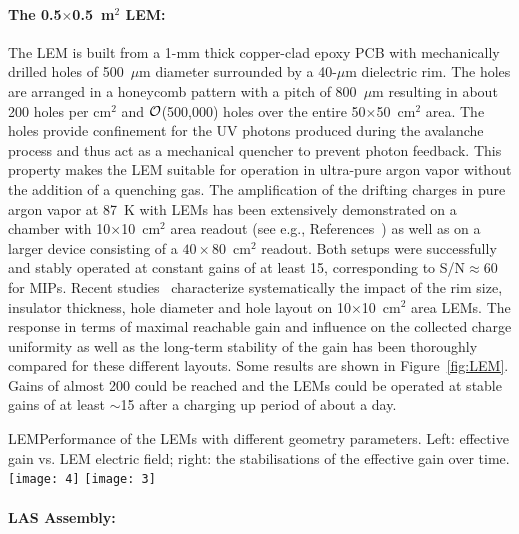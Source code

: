 \paragraph{The 0.5$\times$0.5~m$^2$ LEM:}
The LEM is built from a 1-mm thick copper-clad epoxy PCB with
mechanically drilled holes of 500~$\mu$m diameter surrounded by a
40-$\mu$m dielectric rim. The holes are arranged in a honeycomb
pattern with a pitch of 800~$\mu$m resulting in about 200 holes per cm$^2$
and $\cal O$(500,000) holes over the entire 50$\times$50~cm$^2$
area. The holes provide confinement for the UV photons produced
during the avalanche process and thus act as a mechanical quencher to
prevent photon feedback. This property makes the LEM suitable for
operation in ultra-pure argon vapor without the addition of a
quenching gas. The amplification of the drifting charges in pure argon
vapor at 87~K with LEMs has been extensively demonstrated on a chamber
with 10$\times$10~cm$^2$ area readout (see e.g.,
References~\cite{Badertscher:2008rf,Badertscher:2010fi}) as well as on a
larger device consisting of a $40\times80$~cm$^2$
readout\cite{Badertscher:2013wm}.  Both setups were successfully and stably operated 
at constant gains of at least 15,
corresponding to S/N$\approx$60 for MIPs. Recent
studies~\cite{Cantini:2014xza} characterize systematically the impact
of the rim size, insulator thickness, hole diameter and hole layout on
10$\times$10~cm$^2$ area LEMs. The response in terms of maximal
reachable gain and influence on the collected charge uniformity as
well as the long-term stability of the gain has been thoroughly
compared for these different layouts. Some results are shown in
Figure~\ref{fig:LEM}.  Gains of almost 200 could be  reached and the
LEMs could be operated at stable gains of at least $\sim$15 after a
charging up period of about a day.
\begin{cdrfigure}{LEM}{Performance of the LEMs with different geometry parameters. Left: effective gain vs. LEM electric field; right: the stabilisations of the effective gain over time.}
\texttt{[image: 4]}
\texttt{[image: 3]}
\end{cdrfigure}

\paragraph{LAS Assembly:}

